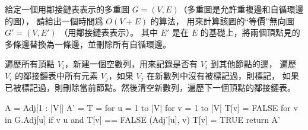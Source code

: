 \startEXERCISE
給定一個用鄰接鏈表表示的多重圖 $G=(V,E)$（多重圖是允許重複邊和自循環邊的圖），
請給出一個時間爲 $O(V+E)$ 的算法，
用來計算該圖的“等價”無向圖 $G'=(V,E')$ （用鄰接鏈表表示）。
其中 $E'$ 是在 $E$ 的基礎上，將兩個頂點見的多條邊替換為一條邊，並刪除所有自循環邊。
\stopEXERCISE

\startANSWER
遍歷所有頂點 $V_i$，新建一個空數列，用來記錄是否有 $V_i$ 到其他節點的邊，
遍歷 $V_i$ 的鄰接鏈表中所有元素 $V_j$，如果 $V_j$ 在新數列中沒有被標記過，則標記，
如果已被標記過，則刪除當前節點。然後清空新數列，遍歷下一個頂點的鄰接鏈表。

\startCLRSCODE
A = Adj[1 : |V|]
A' = 
T = 
for u = 1 to |V|
	for v = 1 to |V|
		T[v] = FALSE
	for  v in G.Adj[u]
		if v \ne u and T[v] == FALSE
			(Adj'[u], v)
			T[v] = TRUE
return A'
\stopCLRSCODE
\stopANSWER
